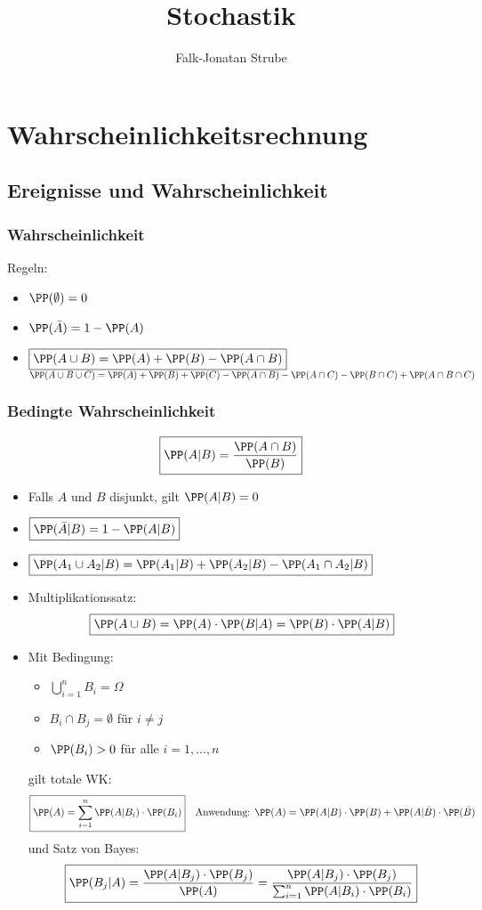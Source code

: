 \documentclass{scrreprt}
\title{Stochastik}
\author{Falk-Jonatan Strube}
\begin{document}
\maketitle

\chapter{Wahrscheinlichkeitsrechnung}
\section{Ereignisse und Wahrscheinlichkeit}
\subsection{Wahrscheinlichkeit}
Regeln:
\begin{itemize}
\item $\PP(\emptyset)=0$
\item $\PP(\bar A) = 1 - \PP (A)$
\item $\boxed{\PP(A \cup B)=\PP(A)+\PP(B)-\PP(A \cap B)}$\\
$\PP ( A \cup B \cup C) = \PP(A) + \PP(B) + \PP(C)-\PP(A \cap B) - \PP(A\cap C) - \PP(B\cap C ) + \PP(A \cap B \cap C)$
\end{itemize}

\subsection{Bedingte Wahrscheinlichkeit}
$$\boxed{\PP(A|B)=\frac{\PP(A \cap B)}{\PP(B)}}$$
\begin{itemize}
\item Falls $A$ und $B$ disjunkt, gilt $\PP(A|B)=0$
\item $\boxed{\PP(\bar A | B) = 1-\PP(A|B)}$
\item $\boxed{\PP(A_1 \cup A_2 | B ) =\PP(A_1 | B ) + \PP (A_2|B) - \PP (A_1 \cap A_2 | B)}$
\item Multiplikationssatz:
$$\boxed{\PP(A\cup B ) = \PP(A ) \cdot \PP(B|A) = \PP(B) \cdot \PP(A|B)}$$
\item Mit Bedingung:
\begin{itemize}
\item $\bigcup_{i=1}^n B_i = \Omega$
\item $B_i \cap B_j = \emptyset $ für $i \not= j$
\item $\PP (B_i) >0$ für alle $i=1,\dots,n$
\end{itemize}
gilt totale WK:
$$\boxed{\PP(A) = \sum_{i=1}^n \PP(A|B_i) \cdot \PP (B_i)} \quad \text{Anwendung: }\PP(A)=\PP(A|B)\cdot \PP(B) + \PP(A | \bar B) \cdot \PP(\bar B)$$
und Satz von Bayes:
$$\boxed{\PP(B_j|A)=\frac{\PP(A|B_j)\cdot \PP(B_j)}{\PP(A)}=\frac{\PP(A|B_j)\cdot \PP(B_j)}{\sum_{i=1}^n \PP(A|B_i) \cdot \PP(B_i)}}$$
\end{itemize}
\end{document}
